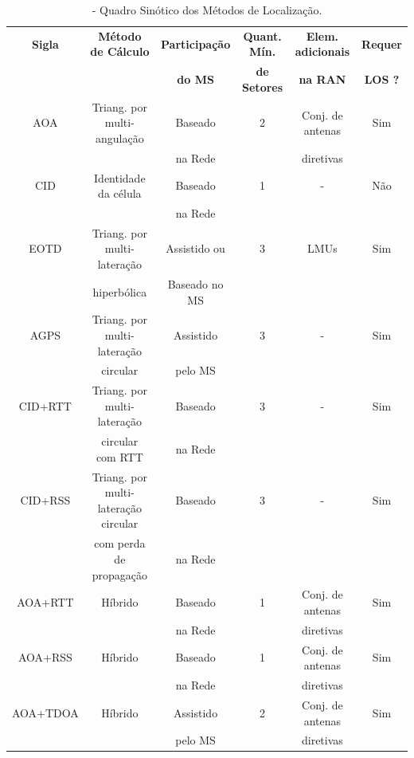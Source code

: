 \begin{table}[h]
\centering
\caption{\label{tab:quadrosinotico}- Quadro Sinótico dos Métodos de Localização.}
\vspace*{.1cm}
\begin{scriptsize}
\begin{tabular}{|c|c|c|c|c|c|}
\hline
\textbf{Sigla} & \textbf{Método de Cálculo} & \textbf{Participação} & \textbf{Quant. Mín.} & \textbf{Elem. adicionais} & \textbf{Requer}\\
& & \textbf{do MS} & \textbf{de Setores} & \textbf{na RAN} & \textbf{LOS ?}\\
\hline
AOA	& Triang. por multi-angulação & Baseado & 2	& Conj. de antenas & Sim \\
& & na Rede & & diretivas & \\
\hline
CID	& Identidade da célula	& Baseado & 1	& - & Não\\
& & na Rede & & & \\
\hline
EOTD	& Triang. por multi-lateração &	Assistido ou &	3	& LMUs & Sim \\
& hiperbólica & Baseado no MS & & & \\
\hline
AGPS	& Triang. por multi-lateração & Assistido & 3 & - & Sim \\
& circular & pelo MS & & & \\
\hline
CID+RTT	& Triang. por multi-lateração &	Baseado & 3	& - & Sim \\
& circular com RTT & na Rede & & & \\
\hline
CID+RSS	& Triang. por multi-lateração circular  &	Baseado & 3	& - & Sim \\
& com perda de propagação & na Rede & & & \\
\hline
AOA+RTT	& Híbrido	& Baseado & 1	&  Conj. de antenas & Sim \\
& & na Rede & & diretivas & \\
\hline
AOA+RSS	& Híbrido	& Baseado & 1	&  Conj. de antenas & Sim \\
& & na Rede & & diretivas& \\
\hline
AOA+TDOA	& Híbrido	& Assistido & 2	&  Conj. de antenas & Sim \\
& & pelo MS & & diretivas& \\
\hline
\end{tabular}
\end{scriptsize}
\vspace*{-.2cm}
\end{table}
